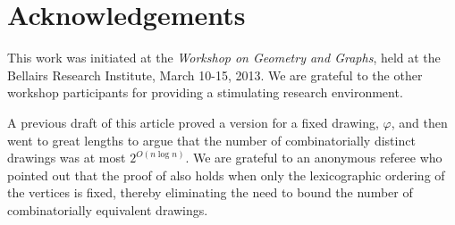 \documentclass[12pt]{article}
\renewcommand{\note}[1]{}
\begin{document}
\section*{Acknowledgements}

This work was initiated at the \emph{Workshop on Geometry and Graphs},
held at the Bellairs Research Institute, March 10-15, 2013.  We are
grateful to the other workshop participants for providing a stimulating
research environment.

A previous draft of this article proved a version  for a
fixed drawing, $\varphi$, and then went to great lengths to argue that the
number of combinatorially distinct drawings was at most $2^{O(n\log n)}$.
We are grateful to an anonymous referee who pointed out that the proof
of  also holds when only the lexicographic ordering
of the vertices is fixed, thereby eliminating the need to bound the number
of combinatorially equivalent drawings.




\end{document}
